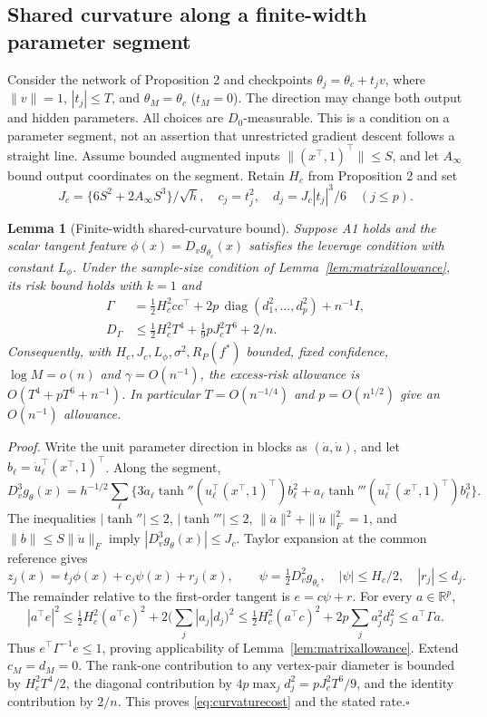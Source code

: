 \documentclass[pdflatex,sn-mathphys-ay]{sn-jnl}
\newtheorem{pathlemma}{Lemma}\renewcommand{\thepathlemma}{S\arabic{pathlemma}}
\theoremstyle{remark}\newtheorem{remark}[theorem]{Remark}
\newcommand{\R}{\mathbb R}
\begin{document}
\subsection{Shared curvature along a finite-width parameter segment}
Consider the network of Proposition 2 and checkpoints
$\theta_j=\theta_c+t_jv$, where $\|v\|=1$, $|t_j|\leq T$, and $\theta_M=\theta_c$ ($t_M=0$). The direction may change both output and hidden parameters. All choices are $D_0$-measurable. This is a condition on a parameter segment, not an assertion that unrestricted gradient descent follows a straight line. Assume bounded augmented inputs $\|(x^\top,1)^\top\|\leq S$, and let $A_\infty$ bound output coordinates on the segment. Retain $H_c$ from Proposition 2 and set
\[
 J_c=\{6S^2+2A_\infty S^3\}/\sqrt h,\quad
 c_j=t_j^2,\quad d_j=J_c|t_j|^3/6\quad(j\leq p).
\]
\begin{pathlemma}[Finite-width shared-curvature bound]\label{lem:curvature}
Suppose A1 holds and the scalar tangent feature
$\phi(x)=D_v g_{\theta_c}(x)$ satisfies the leverage condition with constant $L_\phi$. Under the sample-size condition of Lemma~\ref{lem:matrixallowance}, its risk bound holds with $k=1$ and
\begin{align}
 \Gamma&=\tfrac12H_c^2cc^\top+2p\,\operatorname{diag}(d_1^2,\ldots,d_p^2)+n^{-1}I,\label{eq:curvaturemetric}\\
 D_\Gamma&\leq\tfrac12H_c^2T^4+\tfrac19pJ_c^2T^6+2/n.\label{eq:curvaturecost}
\end{align}
Consequently, with $H_c,J_c,L_\phi,\sigma^2,R_P(f^*)$ bounded, fixed confidence, $\log M=o(n)$ and $\gamma=O(n^{-1})$, the excess-risk allowance is
$O(T^4+pT^6+n^{-1})$. In particular $T=O(n^{-1/4})$ and $p=O(n^{1/2})$ give an $O(n^{-1})$ allowance.
\end{pathlemma}
\noindent\textit{Proof.}
Write the unit parameter direction in blocks as $(\dot a,\dot u)$, and let $b_\ell=\dot u_\ell^\top(x^\top,1)^\top$. Along the segment,
\[
 D_v^3g_\theta(x)=h^{-1/2}\sum_\ell
 \{3\dot a_\ell\tanh''(u_\ell^\top(x^\top,1)^\top)b_\ell^2
 +a_\ell\tanh'''(u_\ell^\top(x^\top,1)^\top)b_\ell^3\}.
\]
The inequalities $|\tanh''|\leq2$, $|\tanh'''|\leq2$, $\|\dot a\|^2+\|\dot u\|_F^2=1$, and $\|b\|\leq S\|\dot u\|_F$ imply $|D_v^3g_\theta(x)|\leq J_c$. Taylor expansion at the common reference gives
\[
 z_j(x)=t_j\phi(x)+c_j\psi(x)+r_j(x),\qquad
 \psi=\tfrac12D_v^2g_{\theta_c},\quad |\psi|\leq H_c/2,\quad |r_j|\leq d_j.
\]
The remainder relative to the first-order tangent is $e=c\psi+r$. For every $a\in\R^p$,
\[
 |a^\top e|^2\leq \tfrac12H_c^2(a^\top c)^2+
 2\Big(\sum_j|a_j|d_j\Big)^2
 \leq\tfrac12H_c^2(a^\top c)^2+2p\sum_ja_j^2d_j^2
 \leq a^\top\Gamma a.
\]
Thus $e^\top\Gamma^{-1}e\leq1$, proving applicability of Lemma~\ref{lem:matrixallowance}. Extend $c_M=d_M=0$. The rank-one contribution to any vertex-pair diameter is bounded by $H_c^2T^4/2$, the diagonal contribution by $4p\max_jd_j^2=pJ_c^2T^6/9$, and the identity contribution by $2/n$. This proves \eqref{eq:curvaturecost} and the stated rate.\hfill$\square$
\end{document}
